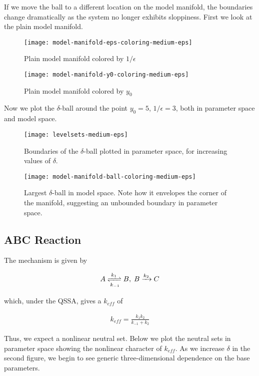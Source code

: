 \documentclass[11pt]{article}
\begin{document}
If we move the ball to a different location on the model manifold, the boundaries change dramatically as the system no longer exhibits sloppiness. First we look at the plain model manifold.

\begin{figure}[ht!]
    \centering
    \texttt{[image: model-manifold-eps-coloring-medium-eps]}
    \caption{Plain model manifold colored by $1/\epsilon$}
\end{figure} %
\begin{figure}[ht!]
    \centering
    \texttt{[image: model-manifold-y0-coloring-medium-eps]}
    \caption{Plain model manifold colored by $y_0$}
\end{figure} %

Now we plot the $\delta$-ball around the point $y_0 = 5$, $1/\epsilon = 3$, both in parameter space and model space.

\begin{figure}[ht!]
    \centering
    \texttt{[image: levelsets-medium-eps]}
    \caption{Boundaries of the $\delta$-ball plotted in parameter space, for increasing values of $\delta$.}
\end{figure}
\begin{figure}[ht!]
    \centering
    \texttt{[image: model-manifold-ball-coloring-medium-eps]}
    \caption{Largest $\delta$-ball in model space. Note how it envelopes the corner of the manifold, suggesting an unbounded boundary in parameter space.}
\end{figure}

\subsection{ABC Reaction}

The mechanism is given by

\begin{align*}
  A \xrightleftharpoons[k_{-1}]{k_1} B, \; B \xrightarrow[]{k_2} C
\end{align*}

which, under the QSSA, gives a $k_{eff}$ of

\begin{align*}
  k_{eff} = \frac{k_1 k_2}{k_{-1} + k_2}
\end{align*}

Thus, we expect a nonlinear neutral set. Below we plot the neutral sets in parameter space showing the nonlinear character of $k_{eff}$. As we increase $\delta$ in the second figure, we begin to see generic three-dimensional dependence on the base parameters.
\end{document}
